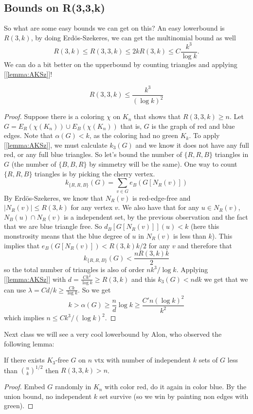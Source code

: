 \subsection{Bounds on R(3,3,k)}
So what are some easy bounds we can get on this? An easy lowerbound
is $R(3,k)$, by doing Erdös-Szekeres,
we can get the multinomial bound as well
\[
	R(3,k) \leq R(3,3,k) \leq 2kR(3,k) \leq C\frac{k^3}{\log k}.
\]
We can do a bit better on the upperbound by counting triangles and
applying [\ref{lemma:AKSz}]!
\begin{theorem}
	\[R(3,3,k) \leq \frac{k^3}{(\log k)^2}\]
\end{theorem}
\begin{proof}
	Suppose there is a coloring $\chi$ on $K_n$ that shows that
	$R(3,3,k) \geq n$. Let $G = E_R(\chi(K_n)) \cup E_B(\chi(K_n))$
	that is, $G$ is the graph of red and blue edges. Note that
	$\alpha(G) < k$, as the coloring had no green $K_k$.
	To apply [\ref{lemma:AKSz}], we must calculate $k_3(G)$ and we know
	it does not have any full red, or any full blue triangles.
	So let's bound the number of $\{R,R,B\}$ triangles in $G$ (the
	number of $\{B,B,R\}$ by simmetry will be the same).
	One way to count $\{R,R,B\}$ triangles is by picking the cherry vertex.
	\[
		k_{\{R,R,B\}}(G) = \sum_{v \in G} e_B(G[N_R(v)])
	\]
	By Erdös-Szekeres, we know that $N_R(v)$ is red-edge-free and
	$|N_R(v)| \leq R(3,k)$ for any vertex $v$.
	We also have that for any $u \in N_R(v)$, $N_B(u) \cap N_R(v)$ is a
	independent set, by the previous observation and the
	fact that we are blue triangle free. So $d_B[G[N_R(v)]](u) < k$
	(here this monstrosity means that the blue degree of $u$ in
	$N_R(v)$ is less than $k$).
	This implies that $e_B(G[N_R(v)]) < R(3,k)k/2$ for any $v$ and therefore that
	\[
		k_{\{R,R,B\}}(G) < \frac{nR(3,k)k}{2}
	\]
	so the total number of triangles is also of order $nk^3/\log k$.
	Applying [\ref{lemma:AKSz}] with $d = \frac{Ck^2}{\log k} \geq  R(3,k)$
	and this $k_3(G) < ndk$ we get that we can use $\lambda = Cd/k \geq
	\frac{Ck}{\log k}$. So we get
	\[
		k > \alpha(G) \geq \frac{n}{d} \log k \geq \frac{C' n (\log k)^2}{k^2}
	\]
	which implies $n \leq Ck^3/(\log k)^2$.
\end{proof}

Next class we will see a very cool lowerbound by Alon, who observed
the following lemma:
\begin{lemma}
	\label{lemma:few_indep_r33k}
	If there exists $K_3$-free $G$ on $n$ vtx with number of
	independent $k$ sets of $G$ less than $\binom{n}{k}^{1/2}$
	then $R(3,3,k) > n$.
\end{lemma}
\begin{proof}
	Embed $G$ randomly in $K_n$ with color red, do it again in color
	blue. By the union bound, no independent $k$ set survive (so we win
	by painting non edges with green).
\end{proof}

